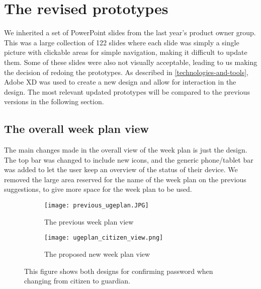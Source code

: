 \section{The revised prototypes}
We inherited a set of PowerPoint slides from the last year's product owner group.
This was a large collection of 122 slides where each slide was simply a single picture with clickable areas for simple navigation, making it difficult to update them.
Some of these slides were also not visually acceptable, leading to us making the decision of redoing the prototypes.
As described in \autoref{technologies-and-tools}, Adobe XD was used to create a new design and allow for interaction in the design.
The most relevant updated prototypes will be compared to the previous versions in the following section.

\subsection{The overall week plan view}
The main changes made in the overall view of the week plan is just the design. 
The top bar was changed to include new icons, and the generic phone/tablet bar was added to let the user keep an overview of the status of their device.
We removed the large area reserved for the name of the week plan on the previous suggestions, to give more space for the week plan to be used. 
\begin{figure}[H]
    \begin{subfigure}{0.5\textwidth}
    \texttt{[image: previous\_ugeplan.JPG]} 
    \caption{The previous week plan view}
    \label{fig:previous_weekplan_view}
    \end{subfigure}
    \begin{subfigure}{0.5\textwidth}
        \texttt{[image: ugeplan\_citizen\_view.png]}
    \caption{The proposed new week plan view}
    \label{fig:new_weekplan_view}
    \end{subfigure} 
    \caption{This figure shows both designs for confirming password when changing from citizen to guardian.}
    \label{fig:weekplan_view}
\end{figure}

